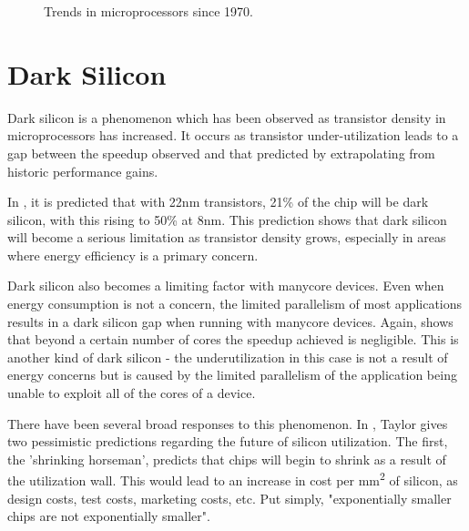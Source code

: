 \documentclass{UoYCSproject}
\begin{document}
\begin{figure}[h]
\caption{Trends in microprocessors since 1970. \cite{karlrupp}}
\end{figure}

\section{Dark Silicon}

Dark silicon is a phenomenon which has been observed as transistor density in microprocessors has increased.
It occurs as transistor under-utilization leads to a gap between the speedup observed and that predicted by
extrapolating from historic performance gains.

In \cite{darksilicon}, it is predicted that with 22nm transistors, 21\% of the chip will be dark silicon,
with this rising to 50\% at 8nm. This prediction shows that dark silicon will become a serious limitation
as transistor density grows, especially in areas where energy efficiency is a primary concern.

Dark silicon also becomes a limiting factor with manycore devices. Even when energy consumption is not a
concern, the limited parallelism of most applications results in a dark silicon gap when running with
manycore devices. Again, \cite{darksilicon} shows that beyond a certain number of cores the speedup achieved
is negligible. This is another kind of dark silicon - the underutilization in this case is not a result of
energy concerns but is caused by the limited parallelism of the application being unable to exploit all of
the cores of a device.

There have been several broad responses to this phenomenon.
In \cite{four-horsemen}, Taylor gives two pessimistic predictions regarding the future of silicon
utilization. The first, the 'shrinking horseman', predicts that chips will begin to shrink as a result of
the utilization wall. This would lead to an increase in cost per mm\textsuperscript{2} of silicon, as
design costs, test costs, marketing costs, etc. Put simply, "exponentially smaller chips are not
exponentially smaller".
\end{document}

